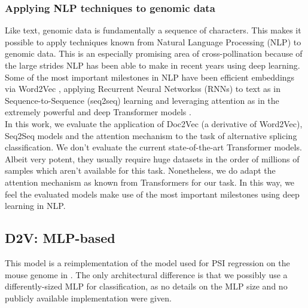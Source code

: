 \subsubsection{Applying NLP techniques to genomic data}
Like text, genomic data is fundamentally a sequence of characters.
This makes it possible to apply techniques known from Natural Language Processing (NLP) to genomic data. This is an especially promising area of cross-pollination because of the large strides NLP has been able to make in recent years using deep learning.
Some of the most important milestones in NLP have been efficient embeddings via Word2Vec \cite{w2v1} \cite{w2v2}, applying Recurrent Neural Networkss (RNNs) to text as in Sequence-to-Sequence (seq2seq) learning \cite{seq2seq} and leveraging attention as in the extremely powerful and deep Transformer models \cite{allyouneed} \cite{bert}.\\
In this work, we evaluate the application of Doc2Vec (a derivative of Word2Vec), Seq2Seq models and the attention mechanism to the task of alternative splicing classification. We don't evaluate the current state-of-the-art Transformer models. Albeit very potent, they usually require huge datasets in the order of millions of samples which aren't available for this task. Nonetheless, we do adapt the attention mechanism as known from Transformers for our task. In this way, we feel the evaluated models make use of the most important milestones using deep learning in NLP.

\subsection{D2V: MLP-based} \label{subsec:d2v}
This model is a reimplementation of the model used for PSI regression on the mouse genome in \cite{d2vsplicing}. The only architectural difference is that we possibly use a differently-sized MLP for classification, as no details on the MLP size and no publicly available implementation were given. 
